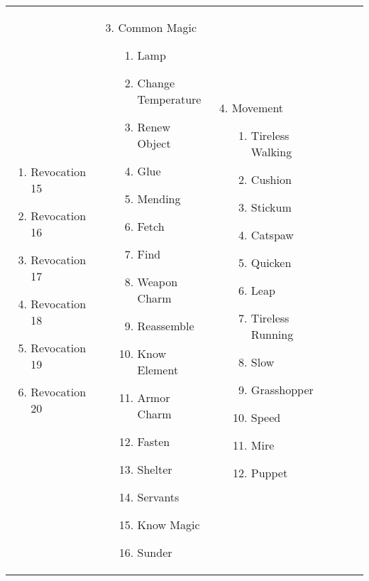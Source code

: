 \begin{tabular}{@{} p{0.25\linewidth} p{0.25\linewidth} p{0.25\linewidth} p{0.25\linewidth}}
\begin{enumerate}
\begin{enumerate}
		\item Revocation 15
		\item Revocation 16
		\item Revocation 17
		\item Revocation 18
		\item Revocation 19
		\item Revocation 20
	\end{enumerate}
\end{enumerate} &
\begin{enumerate}
	\setcounter{enumi}{2}
	\item Common Magic
	\begin{enumerate}
		\item Lamp
		\item Change Temperature
		\item Renew Object
		\item Glue
		\item Mending
		\item Fetch
		\item Find
		\item Weapon Charm
		\item Reassemble
		\item Know Element
		\item Armor Charm
		\item Fasten
		\item Shelter
		\item Servants
		\item Know Magic
		\item Sunder
	\end{enumerate}
\end{enumerate} &
\begin{enumerate}
	\setcounter{enumi}{3}
	\item Movement
	\begin{enumerate}
		\item Tireless Walking
		\item Cushion
		\item Stickum
		\item Catspaw
		\item Quicken
		\item Leap
		\item Tireless Running
		\item Slow
		\item Grasshopper
		\item Speed
		\item Mire
		\item Puppet

\end{enumerate}
\end{enumerate}
\end{tabular}
